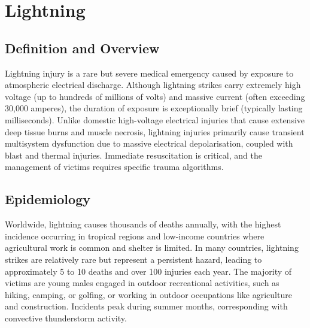 \chapter{Lightning}

\section*{Definition and Overview}
Lightning injury is a rare but severe medical emergency caused by exposure to atmospheric electrical discharge. Although lightning strikes carry extremely high voltage (up to hundreds of millions of volts) and massive current (often exceeding 30,000 amperes), the duration of exposure is exceptionally brief (typically lasting milliseconds). Unlike domestic high-voltage electrical injuries that cause extensive deep tissue burns and muscle necrosis, lightning injuries primarily cause transient multisystem dysfunction due to massive electrical depolarisation, coupled with blast and thermal injuries. Immediate resuscitation is critical, and the management of victims requires specific trauma algorithms.

\section*{Epidemiology}
Worldwide, lightning causes thousands of deaths annually, with the highest incidence occurring in tropical regions and low-income countries where agricultural work is common and shelter is limited. In many countries, lightning strikes are relatively rare but represent a persistent hazard, leading to approximately 5 to 10 deaths and over 100 injuries each year. The majority of victims are young males engaged in outdoor recreational activities, such as hiking, camping, or golfing, or working in outdoor occupations like agriculture and construction. Incidents peak during summer months, corresponding with convective thunderstorm activity.

